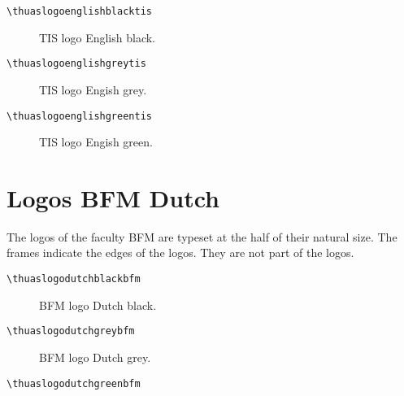\documentclass[a4paper,12pt]{article}
\begin{document}
\begin{verbatim}
\thuaslogoenglishblacktis
\end{verbatim}

\begin{figure}[H]
\centering\fboxsep=0pt%
\fbox{%
\scalebox{0.7071}{\thuaslogoenglishblacktis}}
\caption{TIS logo English black.}
\end{figure}

\begin{verbatim}
\thuaslogoenglishgreytis
\end{verbatim}

\begin{figure}[H]
\centering\fboxsep=0pt%
\fbox{%
\scalebox{0.7071}{\thuaslogoenglishgreytis}}
\caption{TIS logo Engish grey.}
\end{figure}

\begin{verbatim}
\thuaslogoenglishgreentis
\end{verbatim}

\begin{figure}[H]
\centering\fboxsep=0pt%
\fbox{%
\scalebox{0.7071}{\thuaslogoenglishgreentis}}
\caption{TIS logo Engish green.}
\end{figure}


\section{Logos BFM Dutch}
The logos of the faculty BFM are typeset at the half of their natural size.
The frames indicate the edges of the logos. They are not part of the logos.

\begin{verbatim}
\thuaslogodutchblackbfm
\end{verbatim}

\begin{figure}[H]
\centering\fboxsep=0pt%
\fbox{%
\scalebox{0.7071}{\thuaslogodutchblackbfm}}
\caption{BFM logo Dutch black.}
\end{figure}

\begin{verbatim}
\thuaslogodutchgreybfm
\end{verbatim}

\begin{figure}[H]
\centering\fboxsep=0pt%
\fbox{%
\scalebox{0.7071}{\thuaslogodutchgreybfm}}
\caption{BFM logo Dutch grey.}
\end{figure}

\begin{verbatim}
\thuaslogodutchgreenbfm
\end{verbatim}
\end{document}
